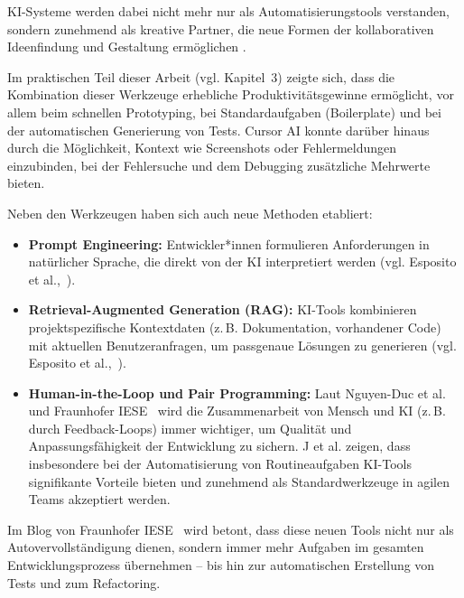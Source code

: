 KI-Systeme werden dabei nicht mehr nur als Automatisierungstools verstanden,
sondern zunehmend als kreative Partner, die neue Formen der kollaborativen
Ideenfindung und Gestaltung ermöglichen \cite{khan_beyond_2025}.

Im praktischen Teil dieser Arbeit (vgl. Kapitel~3) zeigte sich, dass die
Kombination dieser Werkzeuge erhebliche Produktivitätsgewinne ermöglicht, vor
allem beim schnellen Prototyping, bei Standardaufgaben (Boilerplate) und bei
der automatischen Generierung von Tests. Cursor AI konnte darüber hinaus durch
die Möglichkeit, Kontext wie Screenshots oder Fehlermeldungen einzubinden, bei
der Fehlersuche und dem Debugging zusätzliche Mehrwerte bieten.

Neben den Werkzeugen haben sich auch neue Methoden etabliert:
\begin{itemize}
    \item \textbf{Prompt Engineering:} Entwickler*innen formulieren Anforderungen in natürlicher Sprache, die direkt von der KI interpretiert werden (vgl. Esposito et al.,~\cite[S.~2--3]{esposito_generative_2025}).
    \item \textbf{Retrieval-Augmented Generation (RAG):} KI-Tools kombinieren projektspezifische Kontextdaten (z.\,B. Dokumentation, vorhandener Code) mit aktuellen Benutzeranfragen, um passgenaue Lösungen zu generieren (vgl. Esposito et al.,~\cite[S.~4]{esposito_generative_2025}).
    \item \textbf{Human-in-the-Loop und Pair Programming:} Laut Nguyen-Duc et al.~\cite[S.~8]{nguyen-duc_generative_2023} und Fraunhofer IESE~\cite{siebert_generative_2024} wird die Zusammenarbeit von Mensch und KI (z.\,B. durch Feedback-Loops) immer wichtiger, um Qualität und Anpassungsfähigkeit der Entwicklung zu sichern. J et al. \cite{j_integration_2023} zeigen, dass insbesondere bei der Automatisierung von Routineaufgaben KI-Tools signifikante Vorteile bieten und zunehmend als Standardwerkzeuge in agilen Teams akzeptiert werden.
\end{itemize}

Im Blog von Fraunhofer IESE~\cite{siebert_generative_2024} wird betont, dass
diese neuen Tools nicht nur als Autovervollständigung dienen, sondern immer
mehr Aufgaben im gesamten Entwicklungsprozess übernehmen – bis hin zur
automatischen Erstellung von Tests und zum Refactoring.

